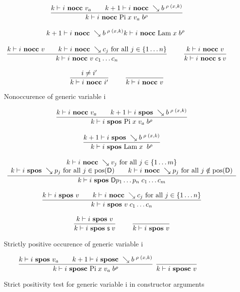 \begin{figure}
\begin{gather*}
\ \dfrac{k\vdash i\mbox{ \textbf{nocc} }v_a \qquad k+1\vdash i\mbox{ \textbf{nocc} }\searrow b^{ \; \rho \; (x,k)}}{k\vdash i\mbox{ \textbf{nocc} }\mathrm{Pi} \; x \; v_a \; b^{\rho}  }
\\[2ex]
{k+1\vdash i\mbox{ \textbf{nocc} }\searrow b^{\; \rho \; (x,k)}}
{k\vdash i\mbox{ \textbf{nocc} }\mathrm{Lam}\; x \; b^{\rho}  }
\\[2ex]
\ \dfrac{k\vdash i\mbox{ \textbf{nocc} }v \qquad k\vdash i\mbox{ \textbf{nocc} }\searrow c_j \mbox{ for all } j \in \{1 \ldots n \}}{k\vdash i\mbox{ \textbf{nocc} }v \; c_1 \ldots c_n}
\qquad
\ \dfrac{k\vdash i\mbox{ \textbf{nocc} }v}{k\vdash i\mbox{ \textbf{nocc} }\mathsf{s}\; v}
\\[2ex]
\ \dfrac{i \neq i'}{k\vdash i\mbox{ \textbf{nocc} }i'}
\qquad
\ \dfrac{}{k\vdash i\mbox{ \textbf{nocc} }v}
\end{gather*}
\caption{Nonoccurence of generic variable i}
\end{figure}

\begin{figure}
\begin{gather*}
\ \dfrac{ k\vdash i\mbox{ \textbf{nocc} }v_a \qquad k+1\vdash i\mbox{ \textbf{spos} }\searrow b^{ \; \rho \; (x,k)}}{k\vdash i\mbox{ \textbf{spos} }\mathrm{Pi} \; x \; v_a \; b^{\rho}  }
\\[2ex]
\ \dfrac{k+1\vdash i\mbox{ \textbf{spos} }\searrow b^{ \; \rho \; (x,k)}}{k\vdash i\mbox{ \textbf{spos} }\mathrm{Lam} \; x \; \; b^{\rho}  }
\\[2ex]
\ \dfrac{\begin{array}[b]{c}k\vdash i\mbox{ \textbf{nocc} }\searrow v_j \mbox{ for all } j \in \{1 \ldots m \}\\k\vdash i\mbox{ \textbf{spos} }\searrow p_j \mbox{ for all } j \in \mbox{pos}(\mathsf{D}) \qquad k\vdash i\mbox{ \textbf{nocc} }\searrow p_j \mbox{ for all } j \notin \mbox{pos}(\mathsf{D}) \end{array}}{k\vdash i\mbox{ \textbf{spos} }\mathsf{D} p_1 \ldots p_n \; c_1 \ldots c_m}
\\[2ex]
\ \dfrac{k\vdash i\mbox{ \textbf{spos} }v \qquad k\vdash i\mbox{ \textbf{nocc} }\searrow c_j \mbox{ for all } j \in \{1 \ldots n \}}{k\vdash i\mbox{ \textbf{spos} }v \; c_1 \ldots c_n}
\\[2ex]
\ \dfrac{k\vdash i\mbox{ \textbf{spos} }v}{k\vdash i\mbox{ \textbf{spos} }\mathsf{s}\; v}
\qquad
\ \dfrac{}{k\vdash i\mbox{ \textbf{spos} }v}
\end{gather*}
\caption{Strictly positive occurence of generic variable i}
\end{figure}


\begin{figure}
\label{sposcf}
\begin{gather*}
\ \dfrac{ k\vdash i\mbox{ \textbf{spos} }v_a \qquad k+1\vdash i\mbox{ \textbf{sposc} }\searrow b^{ \; \rho \; (x,k)}}{k\vdash i\mbox{ \textbf{sposc} }\mathrm{Pi} \; x \; v_a \; b^{\rho}  }
\ \dfrac{}{k\vdash i\mbox{ \textbf{sposc} }v}
\end{gather*}
\caption{Strict positivity test for generic variable i in constructor arguments}
\end{figure}

